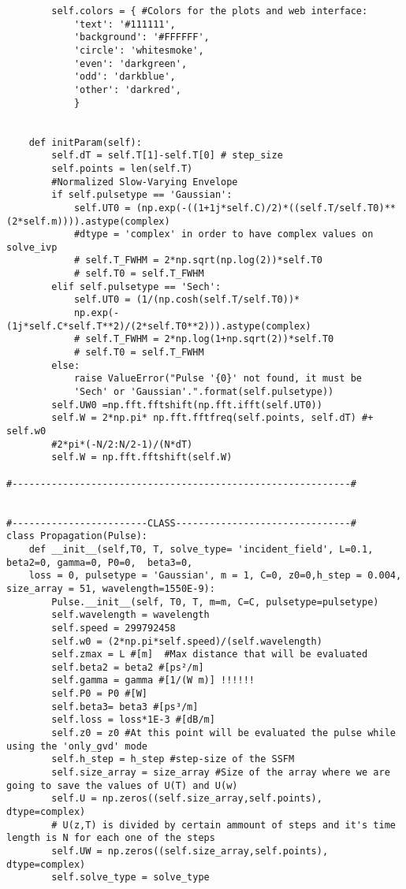 \begin{verbatim}
        self.colors = { #Colors for the plots and web interface:
            'text': '#111111',
            'background': '#FFFFFF',
            'circle': 'whitesmoke',
            'even': 'darkgreen',
            'odd': 'darkblue',
            'other': 'darkred',
            }


    def initParam(self):
        self.dT = self.T[1]-self.T[0] # step_size
        self.points = len(self.T)
        #Normalized Slow-Varying Envelope
        if self.pulsetype == 'Gaussian':
            self.UT0 = (np.exp(-((1+1j*self.C)/2)*((self.T/self.T0)**(2*self.m)))).astype(complex) 
            #dtype = 'complex' in order to have complex values on solve_ivp 
            # self.T_FWHM = 2*np.sqrt(np.log(2))*self.T0
            # self.T0 = self.T_FWHM
        elif self.pulsetype == 'Sech':
            self.UT0 = (1/(np.cosh(self.T/self.T0))*
            np.exp(-(1j*self.C*self.T**2)/(2*self.T0**2))).astype(complex)
            # self.T_FWHM = 2*np.log(1+np.sqrt(2))*self.T0
            # self.T0 = self.T_FWHM
        else:
            raise ValueError("Pulse '{0}' not found, it must be 
            'Sech' or 'Gaussian'.".format(self.pulsetype))
        self.UW0 =np.fft.fftshift(np.fft.ifft(self.UT0))
        self.W = 2*np.pi* np.fft.fftfreq(self.points, self.dT) #+ self.w0
        #2*pi*(-N/2:N/2-1)/(N*dT)
        self.W = np.fft.fftshift(self.W) 

#------------------------------------------------------------#


#------------------------CLASS-------------------------------#
class Propagation(Pulse):
    def __init__(self,T0, T, solve_type= 'incident_field', L=0.1, beta2=0, gamma=0, P0=0,  beta3=0, 
    loss = 0, pulsetype = 'Gaussian', m = 1, C=0, z0=0,h_step = 0.004, size_array = 51, wavelength=1550E-9):
        Pulse.__init__(self, T0, T, m=m, C=C, pulsetype=pulsetype)
        self.wavelength = wavelength
        self.speed = 299792458
        self.w0 = (2*np.pi*self.speed)/(self.wavelength)
        self.zmax = L #[m]  #Max distance that will be evaluated
        self.beta2 = beta2 #[ps²/m]
        self.gamma = gamma #[1/(W m)] !!!!!! 
        self.P0 = P0 #[W]
        self.beta3= beta3 #[ps³/m]
        self.loss = loss*1E-3 #[dB/m]
        self.z0 = z0 #At this point will be evaluated the pulse while using the 'only_gvd' mode
        self.h_step = h_step #step-size of the SSFM
        self.size_array = size_array #Size of the array where we are going to save the values of U(T) and U(w)
        self.U = np.zeros((self.size_array,self.points), dtype=complex) 
        # U(z,T) is divided by certain ammount of steps and it's time length is N for each one of the steps
        self.UW = np.zeros((self.size_array,self.points), dtype=complex)
        self.solve_type = solve_type


\end{verbatim}
